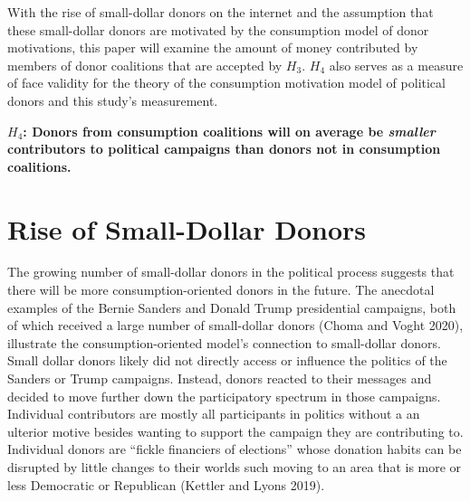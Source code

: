 \documentclass[12pt,]{article}
\begin{document}
With the rise of small-dollar donors on the internet and the assumption
that these small-dollar donors are motivated by the consumption model of
donor motivations, this paper will examine the amount of money
contributed by members of donor coalitions that are accepted by
\(H_{3}\). \(H_{4}\) also serves as a measure of face validity for the
theory of the consumption motivation model of political donors and this
study's measurement.

\textbf{\(H_{4}\): Donors from consumption coalitions will on average be
\emph{smaller} contributors to political campaigns than donors not in
consumption coalitions.}

\hypertarget{rise-of-small-dollar-donors}{%
\section{Rise of Small-Dollar
Donors}\label{rise-of-small-dollar-donors}}

The growing number of small-dollar donors in the political process
suggests that there will be more consumption-oriented donors in the
future. The anecdotal examples of the Bernie Sanders and Donald Trump
presidential campaigns, both of which received a large number of
small-dollar donors (Choma and Voght 2020), illustrate the
consumption-oriented model's connection to small-dollar donors. Small
dollar donors likely did not directly access or influence the politics
of the Sanders or Trump campaigns. Instead, donors reacted to their
messages and decided to move further down the participatory spectrum in
those campaigns. Individual contributors are mostly all participants in
politics without a an ulterior motive besides wanting to support the
campaign they are contributing to. Individual donors are ``fickle
financiers of elections'' whose donation habits can be disrupted by
little changes to their worlds such moving to an area that is more or
less Democratic or Republican (Kettler and Lyons 2019).
\end{document}
